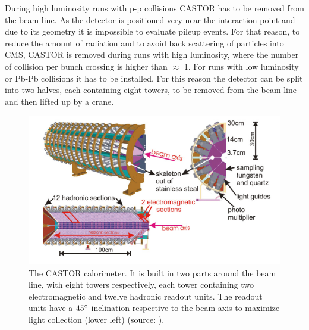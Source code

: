 During high luminosity runs with p-p collisions CASTOR has to be removed from the beam line. As the detector is positioned very near the interaction point and due to its geometry it is impossible to evaluate pileup events. For that reason, to reduce the amount of radiation and to avoid back scattering of particles into CMS, CASTOR is removed during runs with high luminosity, where the number of collision per bunch crossing is higher than $\approx$ 1. For runs with low luminosity or Pb-Pb collisions it has to be installed. For this reason the detector can be split into two halves, each containing eight towers, to be removed from the beam line and then lifted up by a crane. \cite{castor}

\begin{figure}
\centering
\includegraphics[scale=0.8]{castor.png}
\caption{The CASTOR	calorimeter. It is built in two parts around the beam line, with eight towers respectively, each tower containing two electromagnetic and twelve hadronic readout units. The readout units have a $45\degree$ inclination respective to the beam axis to maximize light collection (lower left) (source: \cite{castorbild}).}
\end{figure}
